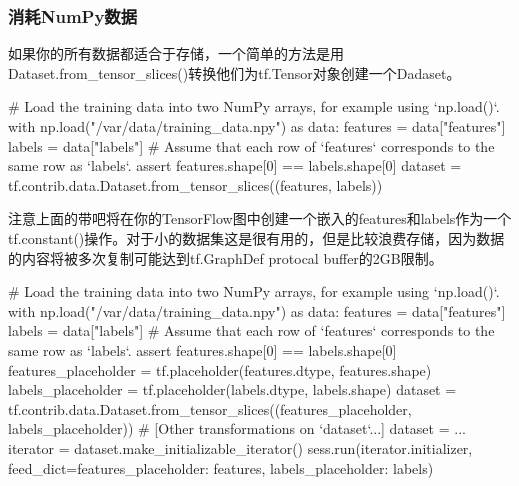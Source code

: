 \subsubsection{消耗NumPy数据}
如果你的所有数据都适合于存储，一个简单的方法是用Dataset.from\_tensor\_slices()转换他们为tf.Tensor对象创建一个Dadaset。
\begin{python}
# Load the training data into two NumPy arrays, for example using `np.load()`.
with np.load("/var/data/training_data.npy") as data:
    features = data["features"]
    labels = data["labels"]
# Assume that each row of `features` corresponds to the same row as `labels`.
assert features.shape[0] == labels.shape[0]
dataset = tf.contrib.data.Dataset.from_tensor_slices((features, labels))
\end{python}
注意上面的带吧将在你的TensorFlow图中创建一个嵌入的features和labels作为一个tf.constant()操作。对于小的数据集这是很有用的，但是比较浪费存储，因为数据的内容将被多次复制可能达到tf.GraphDef protocal buffer的2GB限制。
\begin{python}
# Load the training data into two NumPy arrays, for example using `np.load()`.
with np.load("/var/data/training_data.npy") as data:
    features = data["features"]
    labels = data["labels"]
    # Assume that each row of `features` corresponds to the same row as `labels`.
assert features.shape[0] == labels.shape[0]
features_placeholder = tf.placeholder(features.dtype, features.shape)
labels_placeholder = tf.placeholder(labels.dtype, labels.shape)
dataset = tf.contrib.data.Dataset.from_tensor_slices((features_placeholder, labels_placeholder))
# [Other transformations on `dataset`...]
dataset = ...
iterator = dataset.make_initializable_iterator()
sess.run(iterator.initializer, feed_dict={features_placeholder: features,
                                        labels_placeholder: labels})
\end{python}

